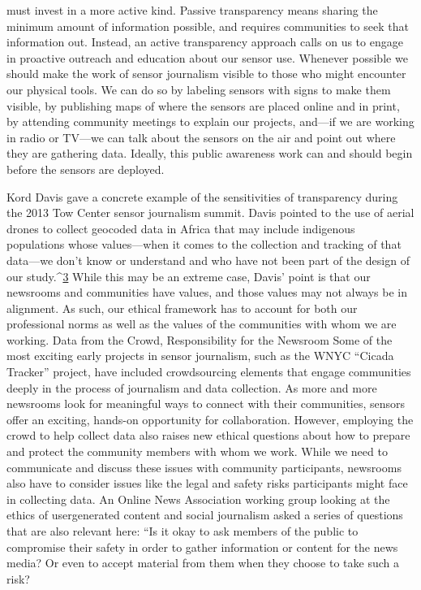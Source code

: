 must invest in a more active kind. Passive transparency means sharing the
minimum amount of information possible, and requires communities to
seek that information out. Instead, an active transparency approach calls
on us to engage in proactive outreach and education about our sensor use.
Whenever possible we should make the work of sensor journalism visible
to those who might encounter our physical tools. We can do so by labeling
sensors with signs to make them visible, by publishing maps of where the
sensors are placed online and in print, by attending community meetings to
explain our projects, and—if we are working in radio or TV—we can talk
about the sensors on the air and point out where they are gathering data.
Ideally, this public awareness work can and should begin before the sensors
are deployed.

Kord Davis gave a concrete example of the sensitivities of transparency during
the 2013 Tow Center sensor journalism summit. Davis pointed to the
use of aerial drones to collect geocoded data in Africa that may include
indigenous populations whose values—when it comes to the collection and
tracking of that data—we don't know or understand and who have not been
part of the design of our study.^{\href{#endnotes-stearns}{3}} While this may be an extreme case, Davis'
point is that our newsrooms and communities have values, and those values
may not always be in alignment. As such, our ethical framework has to
account for both our professional norms as well as the values of the communities
with whom we are working.
Data from the Crowd, Responsibility for the Newsroom
Some of the most exciting early projects in sensor journalism, such as the
WNYC ``Cicada Tracker'' project, have included crowdsourcing elements
that engage communities deeply in the process of journalism and data collection.
As more and more newsrooms look for meaningful ways to connect
with their communities, sensors offer an exciting, hands-on opportunity
for collaboration. However, employing the crowd to help collect data also
raises new ethical questions about how to prepare and protect the community
members with whom we work. While we need to communicate and
discuss these issues with community participants, newsrooms also have
to consider issues like the legal and safety risks participants might face in
collecting data.
An Online News Association working group looking at the ethics of usergenerated
content and social journalism asked a series of questions that are
also relevant here: ``Is it okay to ask members of the public to compromise
their safety in order to gather information or content for the news media?
Or even to accept material from them when they choose to take such a risk?

